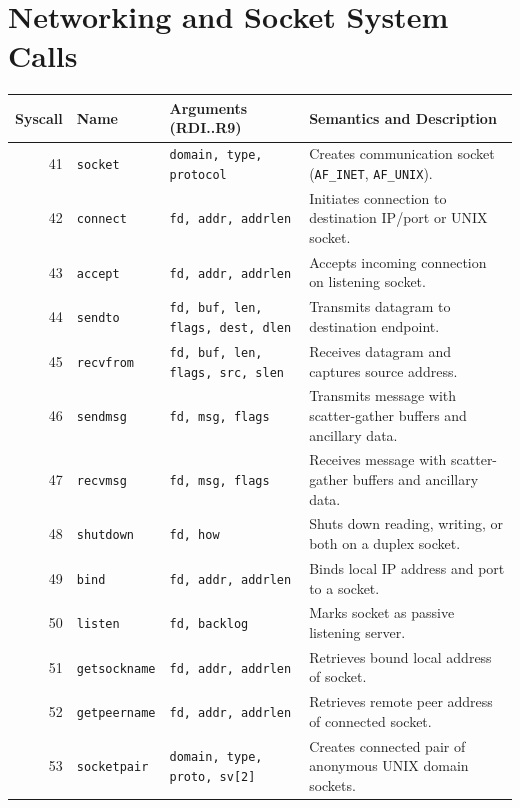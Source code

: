 \section{Networking and Socket System Calls}
\label{sec:ref_net_ops}

\begin{table}[htbp]
\centering
\small
\begin{tabularx}{\textwidth}{rllX}
\toprule
\textbf{Syscall} & \textbf{Name} & \textbf{Arguments (RDI..R9)} & \textbf{Semantics and Description} \\
\midrule
41 & \texttt{socket} & \texttt{domain, type, protocol} & Creates communication socket (\texttt{AF\_INET}, \texttt{AF\_UNIX}). \\
42 & \texttt{connect} & \texttt{fd, addr, addrlen} & Initiates connection to destination IP/port or UNIX socket. \\
43 & \texttt{accept} & \texttt{fd, addr, addrlen} & Accepts incoming connection on listening socket. \\
44 & \texttt{sendto} & \texttt{fd, buf, len, flags, dest, dlen} & Transmits datagram to destination endpoint. \\
45 & \texttt{recvfrom} & \texttt{fd, buf, len, flags, src, slen} & Receives datagram and captures source address. \\
46 & \texttt{sendmsg} & \texttt{fd, msg, flags} & Transmits message with scatter-gather buffers and ancillary data. \\
47 & \texttt{recvmsg} & \texttt{fd, msg, flags} & Receives message with scatter-gather buffers and ancillary data. \\
48 & \texttt{shutdown} & \texttt{fd, how} & Shuts down reading, writing, or both on a duplex socket. \\
49 & \texttt{bind} & \texttt{fd, addr, addrlen} & Binds local IP address and port to a socket. \\
50 & \texttt{listen} & \texttt{fd, backlog} & Marks socket as passive listening server. \\
51 & \texttt{getsockname}& \texttt{fd, addr, addrlen} & Retrieves bound local address of socket. \\
52 & \texttt{getpeername}& \texttt{fd, addr, addrlen} & Retrieves remote peer address of connected socket. \\
53 & \texttt{socketpair} & \texttt{domain, type, proto, sv[2]} & Creates connected pair of anonymous UNIX domain sockets. \\

\end{tabularx}
\end{table}
